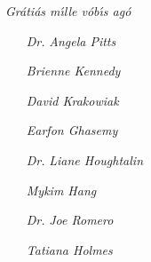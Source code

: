 \thispagestyle{empty}
\vspace*{\fill}
    \textit{Gr\'ati\'as m\'\i lle v\'ob\'\i s ag\'o}
    \begin{itemize}
        \item[\textit{Dr.}] \textit{Angela Pitts}
        \item[] \textit{Brienne Kennedy}
        \item[] \textit{David Krakowiak}
        \item[] \textit{Earfon Ghasemy}
        \item[\textit{Dr.}] \textit{Liane Houghtalin}
        \item[] \textit{Mykim Hang}
        \item[\textit{Dr.}] \textit{Joe Romero}
        \item[] \textit{Tatiana Holmes}
    \end{itemize}
\vspace*{\fill}
\clearpage